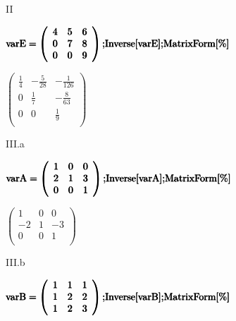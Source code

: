 \documentclass{article}
\begin{document}
II

\begin{doublespace}
\noindent\(\pmb{\text{varE}=\left(
\begin{array}{ccc}
 4 & 5 & 6 \\
 0 & 7 & 8 \\
 0 & 0 & 9 \\
\end{array}
\right);}\\
\pmb{\text{Inverse}[\text{varE}];}\\
\pmb{\text{MatrixForm}[\%]}\)
\end{doublespace}

\begin{doublespace}
\noindent\(\left(
\begin{array}{ccc}
 \frac{1}{4} & -\frac{5}{28} & -\frac{1}{126} \\
 0 & \frac{1}{7} & -\frac{8}{63} \\
 0 & 0 & \frac{1}{9} \\
\end{array}
\right)\)
\end{doublespace}

III.a

\begin{doublespace}
\noindent\(\pmb{\text{varA}=\left(
\begin{array}{ccc}
 1 & 0 & 0 \\
 2 & 1 & 3 \\
 0 & 0 & 1 \\
\end{array}
\right);}\\
\pmb{\text{Inverse}[\text{varA}];}\\
\pmb{\text{MatrixForm}[\%]}\)
\end{doublespace}

\begin{doublespace}
\noindent\(\left(
\begin{array}{ccc}
 1 & 0 & 0 \\
 -2 & 1 & -3 \\
 0 & 0 & 1 \\
\end{array}
\right)\)
\end{doublespace}

III.b

\begin{doublespace}
\noindent\(\pmb{\text{varB}=\left(
\begin{array}{ccc}
 1 & 1 & 1 \\
 1 & 2 & 2 \\
 1 & 2 & 3 \\
\end{array}
\right);}\\
\pmb{\text{Inverse}[\text{varB}];}\\
\pmb{\text{MatrixForm}[\%]}\)
\end{doublespace}
\end{document}
